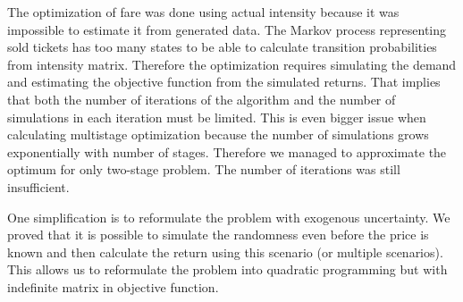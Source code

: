 The optimization of fare was done using actual intensity because it was impossible to estimate it from generated data.
The Markov process representing sold tickets has too many states to be able to calculate transition probabilities from intensity matrix.
Therefore the optimization requires simulating the demand and estimating the objective function from the simulated returns.
That implies that both the number of iterations of the algorithm and the number of simulations in each iteration must be limited.
This is even bigger issue when calculating multistage optimization because the number of simulations grows exponentially with number of stages.
Therefore we managed to approximate the optimum for only two-stage problem.
The number of iterations was still insufficient.

One simplification is to reformulate the problem with exogenous uncertainty.
We proved that it is possible to simulate the randomness even before the price is known and then calculate the return using this scenario (or multiple scenarios).
This allows us to reformulate the problem into quadratic programming but with indefinite matrix in objective function.

